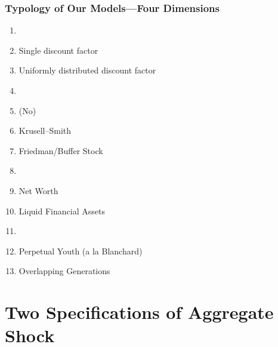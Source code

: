 \begin{frame}
\frametitle{{Typology of Our Models---{Four Dimensions}}}

\begin{block}{}\footnotesize
\begin{enumerate}
\item<0-0> 
\bi \scriptsize
\item {} Single discount factor
\item {} Uniformly distributed discount factor
\ei
\item<1-> 
\bi \scriptsize
\item (No)
\item Krusell--Smith
\item Friedman/Buffer Stock
\ei
\item<0-0> 
\bi \scriptsize
\item Net Worth
\item Liquid Financial Assets
\ei
\item<0-0> 
\bi \scriptsize
\item Perpetual Youth (a la Blanchard)
\item Overlapping Generations
\ei
\end{enumerate}
\end{block}

\end{frame}




\section{Two Specifications of Aggregate Shock}

